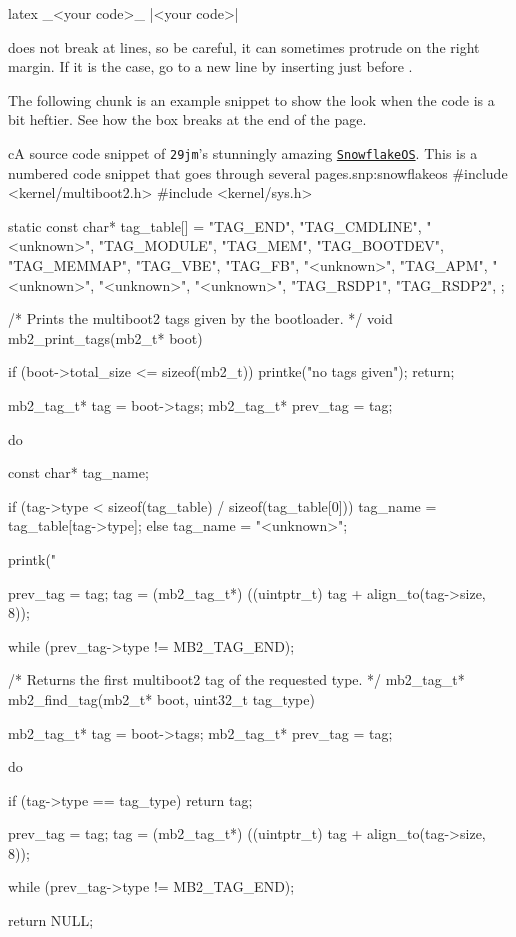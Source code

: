 \documentclass[
	a4paper,
	raggedright,
	twoside,
	12pt,
	colorful,
]{tufte-style-article}
\begin{document}
\begin{codebox}{latex}
_<your code>_ %
|<your code>|
\end{codebox}

 does not break at lines, so be careful, it can sometimes protrude on the right margin. If it is the case, go to a new line by inserting  just before .


The following chunk is an example snippet to show the look when the code is a bit heftier. See how the box breaks at the end of the page.

\begin{snippetnum}{c}{A source code snippet of \texttt{29jm}'s stunningly amazing \href{https://github.com/29jm/SnowflakeOS}{\texttt{SnowflakeOS}}. This is a numbered code snippet that goes through several pages.}{snp:snowflakeos}
#include <kernel/multiboot2.h>
#include <kernel/sys.h>

static const char* tag_table[] = {
	"TAG_END",
	"TAG_CMDLINE",
	"<unknown>",
	"TAG_MODULE",
	"TAG_MEM",
	"TAG_BOOTDEV",
	"TAG_MEMMAP",
	"TAG_VBE",
	"TAG_FB",
	"<unknown>",
	"TAG_APM",
	"<unknown>",
	"<unknown>",
	"<unknown>",
	"TAG_RSDP1",
	"TAG_RSDP2",
};

/* Prints the multiboot2 tags given by the bootloader.
*/
void mb2_print_tags(mb2_t* boot) {
	if (boot->total_size <= sizeof(mb2_t)) {
		printke("no tags given");
		return;
	}

	mb2_tag_t* tag = boot->tags;
	mb2_tag_t* prev_tag = tag;

	do {
		const char* tag_name;

		if (tag->type < sizeof(tag_table) / sizeof(tag_table[0])) {
			tag_name = tag_table[tag->type];
		} else {
			tag_name = "<unknown>";
		}

		printk("%

		prev_tag = tag;
		tag = (mb2_tag_t*) ((uintptr_t) tag + align_to(tag->size, 8));
	} while (prev_tag->type != MB2_TAG_END);
}

/* Returns the first multiboot2 tag of the requested type.
*/
mb2_tag_t* mb2_find_tag(mb2_t* boot, uint32_t tag_type) {
	mb2_tag_t* tag = boot->tags;
	mb2_tag_t* prev_tag = tag;

	do {
		if (tag->type == tag_type) {
			return tag;
		}

		prev_tag = tag;
		tag = (mb2_tag_t*) ((uintptr_t) tag + align_to(tag->size, 8));
	} while (prev_tag->type != MB2_TAG_END);

	return NULL;
}
\end{snippetnum}
\end{document}
